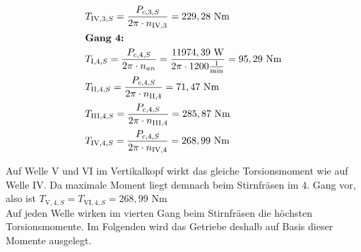 \begin{itemize}
\begin{align*}
	&T_{\mathord{\mathrm{IV}},3,S} = \frac{P_{c,3,S}}{2 \pi \cdot n_{\mathord{\mathrm{IV}},3}} = 229,28 \text{ Nm} \\
	&\textbf{Gang 4: } \\
	&T_{\mathord{\mathrm{I}},4,S} = \frac{P_{c,4,S}}{2 \pi \cdot n_{an}} = \frac{11974,39 \text{ W} }{2 \pi \cdot 1200 \frac{1}{\text{min}}} =95,29 \text{ Nm} \\
	&T_{\mathord{\mathrm{II}},4,S} = \frac{P_{c,4,S}}{2 \pi \cdot n_{\mathord{\mathrm{II}},4}} =71,47\text{ Nm} \\
	&T_{\mathord{\mathrm{III}},4,S} = \frac{P_{c,4,S}}{2 \pi \cdot n_{\mathord{\mathrm{III}},4}} = 285,87 \text{ Nm} \\
	&T_{\mathord{\mathrm{IV}},4,S} = \frac{P_{c,4,S}}{2 \pi \cdot n_{\mathord{\mathrm{IV}},4}} =268,99 \text{ Nm} \\
\end{align*}	
\end{itemize}
\newpage
Auf Welle V und VI im Vertikalkopf wirkt das gleiche Torsionsmoment wie auf Welle IV. Da maximale Moment liegt demnach beim Stirnfräsen im 4. Gang vor, also ist $T_{\mathord{\mathrm{V}},4,S} = T_{\mathord{\mathrm{VI}},4,S} = 268,99 \text{ Nm}$ \\
Auf jeden Welle wirken im vierten Gang beim Stirnfräsen die höchsten Torsionsmomente. Im Folgenden wird das Getriebe deshalb auf Basis dieser Momente ausgelegt. 
